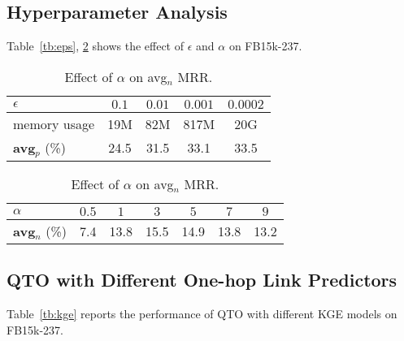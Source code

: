 \subsection{Hyperparameter Analysis}
\label{app:hyper}
Table~\ref{tb:eps}, \ref{tb:alpha} shows the effect of $\epsilon$ and $\alpha$ on FB15k-237.

\begin{table}[htbp]
    \centering
    \begin{minipage}{0.4\linewidth}
        \centering
        \begin{tabular}{lcccc}
            \toprule
            $\epsilon$ & $0.1$ & $0.01$ & $0.001$  & $0.0002$ \\
            \midrule
            memory usage & 19M & 82M & 817M & 20G \\
            {\bf avg$_p$} (\%) & 24.5 & 31.5 & 33.1 & 33.5 \\
            \toprule
        \end{tabular}
        \caption{Effect of $\epsilon$ on memory usage and avg$_p$ MRR.}
        \label{tb:eps}
    \end{minipage}
    \qquad
    \begin{minipage}{0.5\linewidth}
        \centering
        \begin{tabular}{lcccccc}
            \toprule
            $\alpha$ & $0.5$ & $1$ & $3$ & $5$ & $7$ & $9$ \\
            \midrule
            {\bf avg$_n$} (\%) & 7.4 & 13.8 & 15.5 & 14.9 & 13.8 & 13.2 \\
            \toprule
        \end{tabular}
        \caption{Effect of $\alpha$ on avg$_n$ MRR.}
        \label{tb:alpha}
    \end{minipage}
\end{table}

\subsection{QTO with Different One-hop Link Predictors}
\label{app:kge}
Table~\ref{tb:kge} reports the performance of QTO with different KGE models on FB15k-237.

